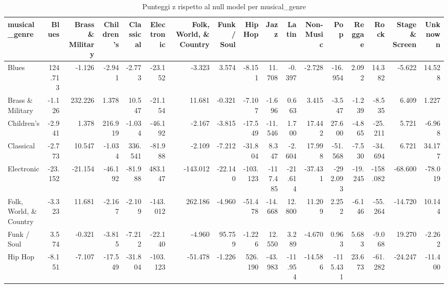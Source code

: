 \begin{table}
\centering
\caption{Punteggi z rispetto al null model per musical_genre}
\label{tab:t3_mixing_genere_musicale_z}
\begin{tabular}{lrrrrrrrrrrrrrrrr}
\toprule
         musical\_genre &   Blues &  Brass \& Military &  Children's &  Classical &  Electronic &  Folk, World, \& Country &  Funk / Soul &  Hip Hop &     Jazz &   Latin &  Non-Music &      Pop &  Reggae &     Rock &  Stage \& Screen &  Unknown \\
\midrule
                 Blues & 124.713 &            -1.126 &      -2.941 &     -2.773 &     -23.152 &                  -3.323 &        3.574 &   -8.151 &   11.708 &  -0.397 &     -2.728 &  -16.954 &   2.092 &   14.382 &          -5.622 &   14.528 \\
      Brass \& Military &  -1.126 &           232.226 &       1.378 &     10.547 &     -21.154 &                  11.681 &       -0.321 &   -7.107 &   -1.696 &   0.663 &      3.415 &   -3.547 &  -1.239 &   -8.535 &           6.409 &    1.227 \\
            Children's &  -2.941 &             1.378 &     216.919 &     -1.034 &     -46.192 &                  -2.167 &       -3.815 &  -17.549 &  -11.546 &   1.700 &     17.442 &   27.600 &  -4.865 &  -25.211 &           5.721 &   -6.968 \\
             Classical &  -2.773 &            10.547 &      -1.034 &    336.541 &     -81.988 &                  -2.109 &       -7.212 &  -31.804 &    8.347 &  -2.604 &     17.998 &  -51.568 &  -7.530 &  -34.694 &           6.721 &   34.177 \\
            Electronic & -23.152 &           -21.154 &     -46.192 &    -81.988 &     483.147 &                -143.012 &      -22.140 & -103.123 & -117.485 & -21.614 &    -37.431 & -292.093 & -19.245 & -158.082 &         -68.600 &  -78.019 \\
Folk, World, \& Country &  -3.323 &            11.681 &      -2.167 &     -2.109 &    -143.012 &                 262.186 &       -4.960 &  -51.478 &  -14.668 &  12.800 &     11.209 &    2.252 &  -6.146 &  -55.264 &         -14.720 &   10.144 \\
           Funk / Soul &   3.574 &            -0.321 &      -3.815 &     -7.212 &     -22.140 &                  -4.960 &       95.759 &   -1.226 &   12.550 &   3.289 &     -4.670 &    0.963 &   5.683 &   -9.068 &          19.270 &   -2.262 \\
               Hip Hop &  -8.151 &            -7.107 &     -17.549 &    -31.804 &    -103.123 &                 -51.478 &       -1.226 &  526.190 &  -43.983 & -11.954 &    -14.586 & -115.431 &  23.673 &  -61.282 &         -24.247 &  -11.400 \\

\end{tabular}
\end{table}
